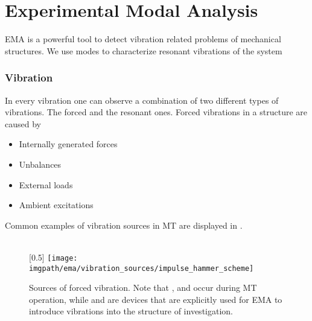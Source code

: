 \section{Experimental Modal Analysis}

\ac{EMA} is a powerful tool to detect vibration related problems of mechanical structures. We use modes to characterize resonant vibrations of the system
\cite{schwarz1999experimental}


\subsubsection{Vibration}

In every vibration one can observe a combination of two different types of vibrations. The forced and the resonant ones. Forced vibrations in a structure are caused by
\begin{itemize}
    \item Internally generated forces
    \item Unbalances
    \item External loads
    \item Ambient excitations
\end{itemize}
Common examples of vibration sources in \ac{MT} are displayed in .

\begin{figure}[!htb]
    \centering
        \hspace{4em}
    \hspace{4em}
    \\[5ex]
    \begingroup
    [0.5\linewidth]{%
        \texttt{[image: \\imgpath/ema/vibration\_sources/impulse\_hammer\_scheme]}}
    \endgroup
    \hspace{0em}
    \caption[Forced Vibration Sources]{Sources of forced vibration. Note that ,  and  occur during \ac{MT} operation, while  and  are devices that are explicitly used for \ac{EMA} to introduce vibrations into the structure of investigation.}
    \label{fig:vibration_sources}
\end{figure}

